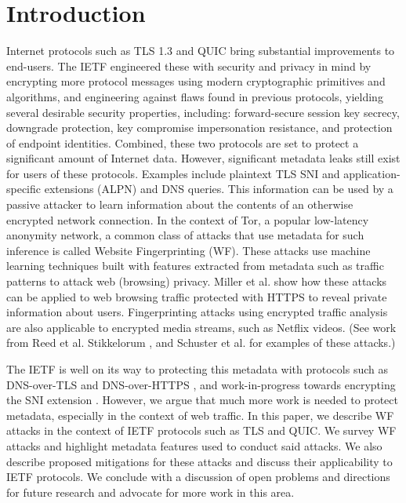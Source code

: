 \documentclass[runningheads]{llncs}
\begin{document}
\section{Introduction}
Internet protocols such as TLS 1.3 \cite{rfc8446} and QUIC \cite{ietf-quic-transport-16} 
bring substantial improvements to end-users. 
The IETF engineered these with security and privacy in mind by encrypting
more protocol messages using modern cryptographic primitives and algorithms, and engineering
against flaws found in previous protocols, yielding several desirable security
properties, including: forward-secure session key secrecy, downgrade protection, key 
compromise impersonation resistance, and protection of endpoint identities. 
Combined, these two protocols are set to protect a significant amount of Internet data. 
However, significant metadata leaks still exist for users of these protocols. Examples include
plaintext TLS SNI and application-specific extensions (ALPN) and DNS queries. This information
can be used by a passive attacker to learn information about the contents of an otherwise
encrypted network connection. In the context of Tor, a popular low-latency anonymity
network, a common class of attacks that use metadata for such inference is called
Website Fingerprinting (WF). These attacks use machine learning techniques built with
features extracted from metadata such as traffic patterns to attack web (browsing) privacy.
Miller et al. \cite{miller2014know} show how these attacks can be applied to web browsing
traffic protected with HTTPS to reveal private information about users.
Fingerprinting attacks using encrypted traffic analysis are also applicable to encrypted
media streams, such as Netflix videos. (See work from Reed et al. \cite{reed2017identifying} 
Stikkelorum \cite{stikkelorum2017know}, and Schuster et al. \cite{schuster2017beauty} 
for examples of these attacks.)

The IETF is well on its way to protecting this metadata with protocols such as DNS-over-TLS 
and DNS-over-HTTPS \cite{rfc8484}, and work-in-progress towards encrypting 
the SNI extension \cite{ietf-tls-esni-02}. However, we argue 
that much more work is needed to protect metadata, especially in the context of web traffic. 
In this paper, we describe WF attacks in the context of IETF protocols
such as TLS and QUIC. We survey WF attacks and highlight metadata features used to conduct
said attacks. We also describe proposed mitigations for these attacks and discuss their
applicability to IETF protocols. We conclude with a discussion of open problems and directions
for future research and advocate for more work in this area. 
\end{document}
